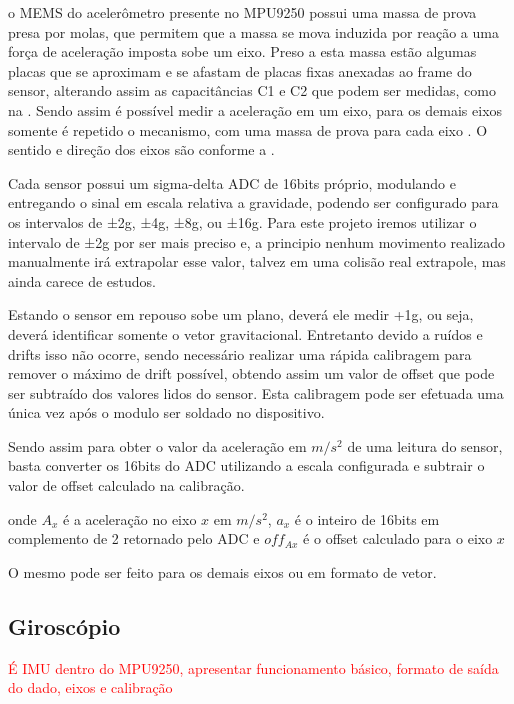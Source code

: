     o \acrshort{MEMS} do acelerômetro presente no MPU9250 possui uma massa de prova presa por molas, que permitem que a massa se mova induzida por reação a uma força de aceleração imposta sobe um eixo. Preso a esta massa estão algumas placas que se aproximam e se afastam de placas fixas anexadas ao frame do sensor, alterando assim as capacitâncias C1 e C2 que podem ser medidas, como na . Sendo assim é possível medir a aceleração em um eixo, para os demais eixos somente é repetido o mecanismo, com uma massa de prova para cada eixo \cite{nedelkovski_mems_2015, invensense_mpu-9250_2016}. O sentido e direção dos eixos são conforme a .
    
    
    Cada sensor possui um sigma-delta ADC de 16bits próprio, modulando e entregando o sinal em escala relativa a gravidade, podendo ser configurado para os intervalos de ±2g, ±4g, ±8g, ou ±16g. Para este projeto iremos utilizar o intervalo de ±2g por ser mais preciso e, a principio nenhum movimento realizado manualmente irá extrapolar esse valor, talvez em uma colisão real extrapole, mas ainda carece de estudos.
    
    Estando o sensor em repouso sobe um plano, deverá ele medir +1g, ou seja, deverá identificar somente o vetor gravitacional. Entretanto devido a ruídos e drifts isso não ocorre, sendo necessário realizar uma rápida calibragem para remover o máximo de drift possível, obtendo assim um valor de offset que pode ser subtraído dos valores lidos do sensor. Esta calibragem pode ser efetuada uma única vez após o modulo ser soldado no dispositivo.
    
    Sendo assim para obter o valor da aceleração em $m/s^2$ de uma leitura do sensor, basta converter os 16bits do ADC utilizando a escala configurada e subtrair o valor de offset calculado na calibração.

    
    onde $A_x$ é a aceleração no eixo $x$ em $m/s^2$, $a_x$ é o inteiro de 16bits em complemento de 2 retornado pelo ADC e $off_{Ax}$ é o offset calculado para o eixo $x$
    
    O mesmo pode ser feito para os demais eixos ou em formato de vetor.

    \subsection{Giroscópio}
    \textcolor{red}{É IMU dentro do MPU9250, apresentar funcionamento básico, formato de saída do dado, eixos e calibração}
    
